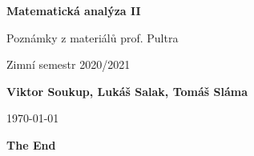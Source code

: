\documentclass[11pt]{article}
\theoremstyle{nontheoremstyle}
\theoremstyle{nontheoremstylenodot}
\theoremstyle{theoremstyle}
\begin{document}
\begin{titlepage}
    \begin{center}
        \vspace*{1cm}
            
        \Huge
        \textbf{Matematická analýza II}
            
        \vspace{2cm}
        \Large
        Poznámky z materiálů prof. Pultra

        \vspace{3mm}
        
        Zimní semestr 2020/2021
        
        \vspace{1.5cm}
            
        \textbf{Viktor Soukup, Lukáš Salak, Tomáš Sláma}
        
        \vfill
        \flushright
        \normalsize
        \today
        
    \end{center}
\end{titlepage}

\tableofcontents
\clearpage












\vfill
\begin{center}
\LARGE
\textbf{The End}
\end{center}
\end{document}
